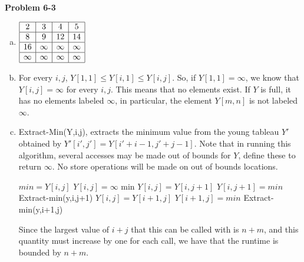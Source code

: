 \documentclass{article}
\begin{document}
\noindent\textbf{Problem 6-3}\\
\begin{enumerate}[a.]
\item
$
\begin{array}{|c|c|c|c|}
\hline
2&3&4&5\\
\hline
8&9&12&14\\
\hline
16&\infty&\infty&\infty\\
\hline
\infty&\infty&\infty&\infty\\
\hline
\end{array}
$

\item
For every $i,j$, $Y[1,1] \le Y[i,1] \le Y[i,j]$. So, if $Y[1,1] = \infty$, we know that $Y[i,j]=\infty$ for every $i,j$. This means that no elements exist. If $Y$ is full, it has no elements labeled $\infty$, in particular, the element $Y[m,n]$ is not labeled $\infty$.
\item
Extract-Min(Y,i,j), extracts the minimum value from the young tableau $Y'$ obtained by $Y'[i',j'] = Y[i'+i-1,j'+j-1]$. Note that in running this algorithm, several accesses may be made out of bounds for $Y$, define these to return $\infty$. No store operations will be made on out of bounds locations.
\begin{algorithm}
\begin{algorithmic}[1]
\State $min = Y[i,j]$
\State $Y[i,j] = \infty$
\State \Return min
\EndIf
{}
\State $Y[i,j] = Y[i,j+1]$
\State $Y[i,j+1] = min$
\State \Return Extract-min(y,i,j+1)
\Else
\State $Y[i,j] = Y[i+1,j]$
\State $Y[i+1,j] = min$
\State \Return Extract-min(y,i+1,j)
\EndIf
\end{algorithmic}
\end{algorithm}
Since the largest value of $i+j$ that this can be called with is $n+m$, and this quantity must increase by one for each call, we have that the runtime is bounded by $n+m$.


\end{enumerate}
\end{document}
